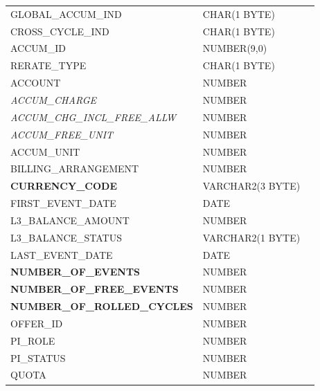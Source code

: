 \documentclass[12pt,twoside]{article}
\begin{document}
\begin{longtable}{lll}
 GLOBAL\_ACCUM\_IND                   &  CHAR(1 BYTE)         &               \\
 CROSS\_CYCLE\_IND                    &  CHAR(1 BYTE)         &               \\
 ACCUM\_ID                            &  NUMBER(9,0)          &               \\
 RERATE\_TYPE                         &  CHAR(1 BYTE)         &               \\
 ACCOUNT                              &  NUMBER               &               \\
 \emph{ACCUM\_CHARGE}                 &  NUMBER               &               \\
 \emph{ACCUM\_CHG\_INCL\_FREE\_ALLW}  &  NUMBER               &               \\
 \emph{ACCUM\_FREE\_UNIT}             &  NUMBER               &               \\
 ACCUM\_UNIT                          &  NUMBER               &               \\
 BILLING\_ARRANGEMENT                 &  NUMBER               &               \\
 \textbf{CURRENCY\_CODE}              &  VARCHAR2(3 BYTE)     &               \\
 FIRST\_EVENT\_DATE                   &  DATE                 &               \\
 L3\_BALANCE\_AMOUNT                  &  NUMBER               &               \\
 L3\_BALANCE\_STATUS                  &  VARCHAR2(1 BYTE)     &               \\
 LAST\_EVENT\_DATE                    &  DATE                 &               \\
 \textbf{NUMBER\_OF\_EVENTS}          &  NUMBER               &               \\
 \textbf{NUMBER\_OF\_FREE\_EVENTS}    &  NUMBER               &               \\
 \textbf{NUMBER\_OF\_ROLLED\_CYCLES}  &  NUMBER               &               \\
 OFFER\_ID                            &  NUMBER               &               \\
 PI\_ROLE                             &  NUMBER               &               \\
 PI\_STATUS                           &  NUMBER               &               \\
 QUOTA                                &  NUMBER               &               \\

\end{longtable}
\end{document}
